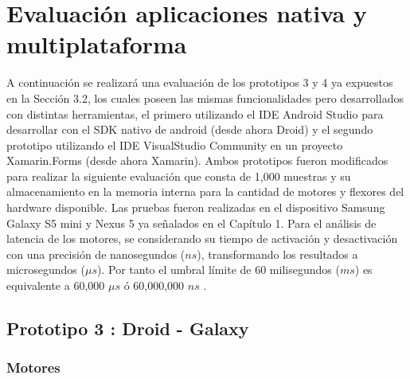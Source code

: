 \section{Evaluación aplicaciones nativa y multiplataforma}

A continuación se realizará una evaluación de los prototipos 3 y 4 ya expuestos en la Sección 3.2, los cuales poseen las mismas funcionalidades pero desarrollados con distintas herramientas, el primero utilizando el IDE Android Studio para desarrollar con el SDK nativo de android (desde ahora Droid) y el segundo prototipo utilizando el IDE VisualStudio Community en un proyecto Xamarin.Forms (desde ahora Xamarin). Ambos prototipos fueron modificados para realizar la siguiente evaluación que consta de 1,000 muestras y su almacenamiento en la memoria interna para la cantidad de motores y flexores del hardware disponible. Las pruebas fueron realizadas en el dispositivo Samsung Galaxy S5 mini y Nexus 5 ya señalados en el Capítulo 1. Para el análisis de latencia de los motores, se considerando su tiempo de activación y desactivación con una precisión de nanosegundos ($ns$), transformando los resultados a microsegundos ($\mu s$).  Por tanto el umbral límite de 60 milisegundos ($ms$) es equivalente a 60,000 $\mu s$ ó 60,000,000 $ns$ .

\subsection{Prototipo 3 : Droid - Galaxy}

\subsubsection{Motores}


